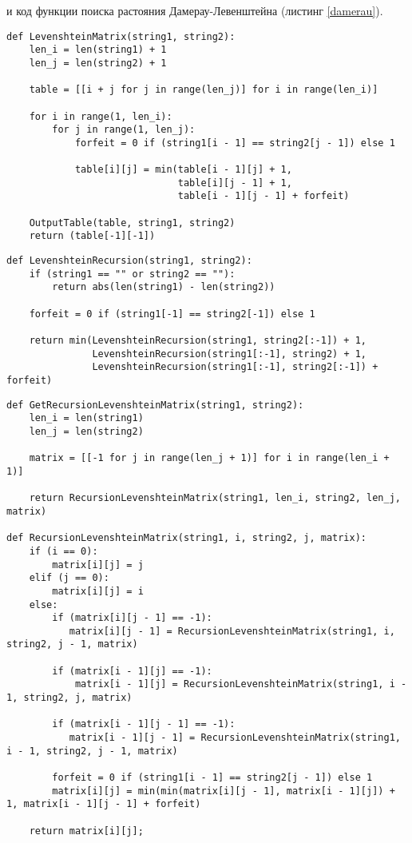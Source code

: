 \documentclass[utf8x, 12pt]{G7-32}
\begin{document}
        и код функции поиска растояния Дамерау-Левенштейна (листинг \ref{damerau}).

\begin{lstlisting}[label=levmatr,caption=Функция нахождения расстояния Левенштейна матрично]
def LevenshteinMatrix(string1, string2):
    len_i = len(string1) + 1
    len_j = len(string2) + 1

    table = [[i + j for j in range(len_j)] for i in range(len_i)]

    for i in range(1, len_i):
        for j in range(1, len_j):
            forfeit = 0 if (string1[i - 1] == string2[j - 1]) else 1

            table[i][j] = min(table[i - 1][j] + 1,
                              table[i][j - 1] + 1,
                              table[i - 1][j - 1] + forfeit)

    OutputTable(table, string1, string2)
    return (table[-1][-1])
\end{lstlisting}


\begin{lstlisting}[label=levrec,caption=Функция нахождения расстояния Левенштейна рекурсивно без матрицы]
def LevenshteinRecursion(string1, string2):
    if (string1 == "" or string2 == ""):
        return abs(len(string1) - len(string2))

    forfeit = 0 if (string1[-1] == string2[-1]) else 1

    return min(LevenshteinRecursion(string1, string2[:-1]) + 1,
               LevenshteinRecursion(string1[:-1], string2) + 1,
               LevenshteinRecursion(string1[:-1], string2[:-1]) + forfeit)
\end{lstlisting}


\begin{lstlisting}[label=levrecmatr,caption=Функция нахождения расстояния Левенштейна рекурсивно с матрицей]
def GetRecursionLevenshteinMatrix(string1, string2):
    len_i = len(string1)
    len_j = len(string2)
    
    matrix = [[-1 for j in range(len_j + 1)] for i in range(len_i + 1)]

    return RecursionLevenshteinMatrix(string1, len_i, string2, len_j, matrix)

def RecursionLevenshteinMatrix(string1, i, string2, j, matrix):
    if (i == 0):
        matrix[i][j] = j
    elif (j == 0):
        matrix[i][j] = i
    else:
        if (matrix[i][j - 1] == -1):
           matrix[i][j - 1] = RecursionLevenshteinMatrix(string1, i, string2, j - 1, matrix)

        if (matrix[i - 1][j] == -1):
            matrix[i - 1][j] = RecursionLevenshteinMatrix(string1, i - 1, string2, j, matrix)

        if (matrix[i - 1][j - 1] == -1):
           matrix[i - 1][j - 1] = RecursionLevenshteinMatrix(string1, i - 1, string2, j - 1, matrix)

        forfeit = 0 if (string1[i - 1] == string2[j - 1]) else 1
        matrix[i][j] = min(min(matrix[i][j - 1], matrix[i - 1][j]) + 1, matrix[i - 1][j - 1] + forfeit)

    return matrix[i][j];
\end{lstlisting}
\end{document}
